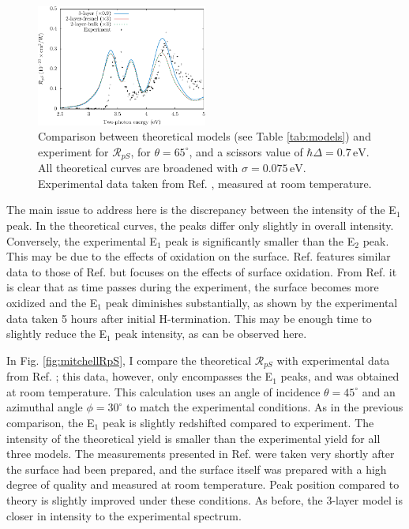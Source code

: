\begin{figure}[H]
\centering
\includegraphics[width=0.5\textwidth]{content/figures/fig-Si1x1-Mejia_RpS}
\caption{Comparison between theoretical models (see Table \ref{tab:models}) and experiment for $\mathcal{R}_{pS}$, for $\theta=65^{\circ}$, and a scissors value of $\hbar\Delta = 0.7\,\text{eV}$. All theoretical curves are broadened with $\sigma=0.075\,\text{eV}$. Experimental data taken from Ref. \cite{mejiaPRB02}, measured at room temperature.}
\label{fig:RpS}
\end{figure}

The main issue to address here is the discrepancy between the intensity of the E$_{1}$ peak. In the theoretical curves, the peaks differ only slightly in overall intensity. Conversely, the experimental E$_{1}$ peak is significantly smaller than the E$_{2}$ peak. This may be due to the effects of oxidation on the surface. Ref. \cite{bergfeldPRL04} features similar data to those of Ref. \cite{mejiaPRB02} but focuses on the effects of surface oxidation. From Ref. \cite{bergfeldPRL04} it is clear that as time passes during the experiment, the surface becomes more oxidized and the E$_{1}$ peak diminishes substantially, as shown by the experimental data taken 5 hours after initial H-termination. This may be enough time to slightly reduce the E$_{1}$ peak intensity, as can be observed here.

In Fig. \ref{fig:mitchellRpS}, I compare the theoretical $\mathcal{R}_{pS}$ with experimental data from Ref. \cite{mitchellSS01}; this data, however, only encompasses the E$_{1}$ peaks, and was obtained at room temperature. This calculation uses an angle of incidence $\theta=45^\circ$ and an azimuthal angle $\phi=30^\circ$ to match the experimental conditions. As in the previous comparison, the E$_{1}$ peak is slightly redshifted compared to experiment. The intensity of the theoretical yield is smaller than the experimental yield for all three models. The measurements presented in Ref. \cite{mitchellSS01} were taken very shortly after the surface had been prepared, and the surface itself was prepared with a high degree of quality and measured at room temperature. Peak position compared to theory is slightly improved under these conditions. As before, the 3-layer model is closer in intensity to the experimental spectrum.

